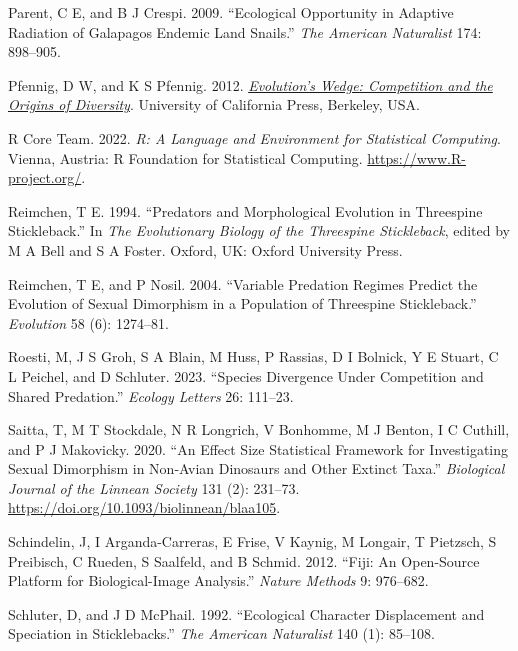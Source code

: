 \documentclass[
  12pt,
]{article}
\newlength{\cslhangindent}
\newlength{\cslentryspacingunit} %
\newenvironment{CSLReferences}[2] %
 {%
  \setlength{\parindent}{0pt}
  \ifodd #1
  \let\oldpar\par
  \def\par{\hangindent=\cslhangindent\oldpar}
  \fi
  \setlength{\parskip}{#2\cslentryspacingunit}
 }%
 {}
\begin{document}
\begin{CSLReferences}{1}{0}
\leavevmode{}%
Parent, C E, and B J Crespi. 2009. {``Ecological Opportunity in Adaptive
Radiation of Galapagos Endemic Land Snails.''} \emph{The American
Naturalist} 174: 898--905.

\leavevmode{}%
Pfennig, D W, and K S Pfennig. 2012. \emph{\href{}{Evolution's Wedge:
Competition and the Origins of Diversity}}. University of California
Press, Berkeley, USA.

\leavevmode{}%
R Core Team. 2022. \emph{R: A Language and Environment for Statistical
Computing}. Vienna, Austria: R Foundation for Statistical Computing.
\url{https://www.R-project.org/}.

\leavevmode{}%
Reimchen, T E. 1994. {``Predators and Morphological Evolution in
Threespine Stickleback.''} In \emph{The Evolutionary Biology of the
Threespine Stickleback}, edited by M A Bell and S A Foster. Oxford, UK:
Oxford University Press.

\leavevmode{}%
Reimchen, T E, and P Nosil. 2004. {``Variable Predation Regimes Predict
the Evolution of Sexual Dimorphism in a Population of Threespine
Stickleback.''} \emph{Evolution} 58 (6): 1274--81.

\leavevmode{}%
Roesti, M, J S Groh, S A Blain, M Huss, P Rassias, D I Bolnick, Y E
Stuart, C L Peichel, and D Schluter. 2023. {``Species Divergence Under
Competition and Shared Predation.''} \emph{Ecology Letters} 26: 111--23.

\leavevmode{}%
Saitta, T, M T Stockdale, N R Longrich, V Bonhomme, M J Benton, I C
Cuthill, and P J Makovicky. 2020. {``An Effect Size Statistical
Framework for Investigating Sexual Dimorphism in Non-Avian Dinosaurs and
Other Extinct Taxa.''} \emph{Biological Journal of the Linnean Society}
131 (2): 231--73. \url{https://doi.org/10.1093/biolinnean/blaa105}.

\leavevmode{}%
Schindelin, J, I Arganda-Carreras, E Frise, V Kaynig, M Longair, T
Pietzsch, S Preibisch, C Rueden, S Saalfeld, and B Schmid. 2012.
{``Fiji: An Open-Source Platform for Biological-Image Analysis.''}
\emph{Nature Methods} 9: 976--682.

\leavevmode{}%
Schluter, D, and J D McPhail. 1992. {``Ecological Character Displacement
and Speciation in Sticklebacks.''} \emph{The American Naturalist} 140
(1): 85--108.


\end{CSLReferences}
\end{document}
